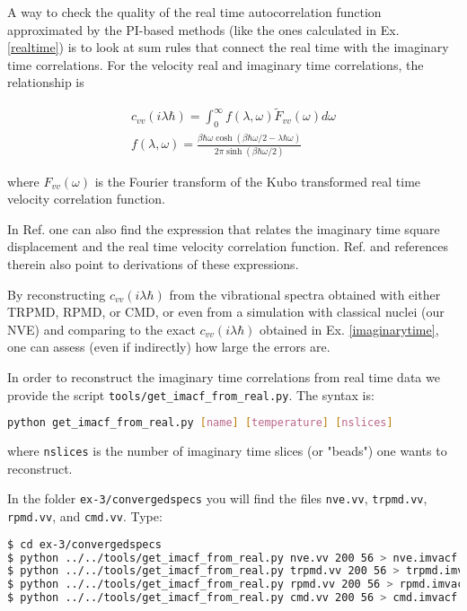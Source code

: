 \documentclass{article}
\begin{document}
\begin{Exercise}[label={relationship},title={Relationship between imaginary and real time correlations}]

A way to check the quality of the real time autocorrelation function approximated by the PI-based methods (like the ones calculated in Ex. \ref{realtime}) is to look at sum rules that connect the real time with the imaginary time correlations. For the velocity real and imaginary time correlations, the relationship is

\begin{eqnarray}
c_{vv}(i \lambda \hbar)=\int_0^\infty f(\lambda, \omega) \tilde{F}_{vv}(\omega) d\omega \\
f(\lambda, \omega)=\frac{\beta\hbar\omega\cosh(\beta\hbar\omega/2-\lambda\hbar\omega)}{2\pi\sinh(\beta\hbar\omega/2)}
\end{eqnarray}

\noindent where $F_{vv}(\omega)$ is the Fourier transform of the Kubo transformed real time velocity correlation function.

In Ref. \cite{tuck08book} one can also find the expression that relates the imaginary time square displacement and the real time velocity correlation function. Ref. \cite{habe+07jcp} and references therein also point to derivations of these expressions. 

By reconstructing $c_{vv}(i \lambda \hbar)$ from the vibrational spectra obtained with either TRPMD, RPMD, or CMD, or even from a simulation with classical nuclei (our NVE) and comparing to the exact $c_{vv}(i \lambda \hbar)$ obtained in Ex. \ref{imaginarytime}, one can assess (even if indirectly) how large the errors are. 

In order to reconstruct the imaginary time correlations from real time data we provide the script \texttt{tools/get\_imacf\_from\_real.py}. The syntax is:

\begin{lstlisting}[language=Bash]
python get_imacf_from_real.py [name] [temperature] [nslices]
\end{lstlisting}

\noindent where \texttt{nslices} is the number of imaginary time slices (or "beads") one wants to reconstruct.

In the folder \texttt{ex-3/convergedspecs} you will find the files \texttt{nve.vv}, \texttt{trpmd.vv}, \texttt{rpmd.vv}, and \texttt{cmd.vv}. Type:

\begin{lstlisting}[language=Bash,emph={\$}]
$ cd ex-3/convergedspecs
$ python ../../tools/get_imacf_from_real.py nve.vv 200 56 > nve.imvacf
$ python ../../tools/get_imacf_from_real.py trpmd.vv 200 56 > trpmd.imvacf
$ python ../../tools/get_imacf_from_real.py rpmd.vv 200 56 > rpmd.imvacf
$ python ../../tools/get_imacf_from_real.py cmd.vv 200 56 > cmd.imvacf
\end{lstlisting}


\end{Exercise}
\end{document}
